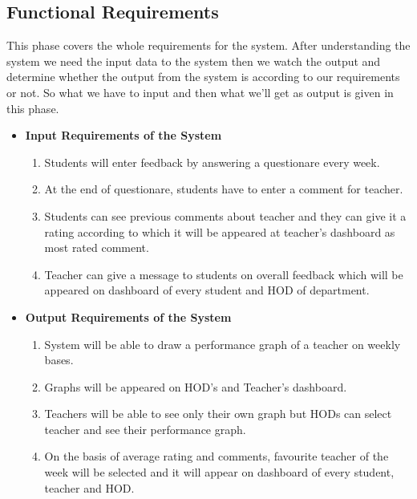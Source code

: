 \subsection{Functional Requirements}
This phase covers the whole requirements for the system. After 
understanding the system we need the input data to the system then we 
watch the output and determine whether the output from the system is 
according to our requirements or not. So what we have to input and 
then what we’ll get as output is given in this phase.
\begin{itemize}
    \item{\bf Input Requirements of the System}
        \begin{enumerate}
            \item Students will enter feedback by answering a 
                questionare every week.
            \item At the end of questionare, students have to enter a 
                comment for teacher.
            \item Students can see previous comments about teacher and 
                they can give it a rating according to which it will be 
                appeared at teacher's dashboard as most rated comment.
            \item Teacher can give a message to students on overall 
                feedback which will be appeared on dashboard of every 
                student and HOD of department.
        \end{enumerate}
    \item{\bf Output Requirements of the System}
        \begin{enumerate}
            \item System will be able to draw a performance graph of a
                teacher on weekly bases.
            \item Graphs will be appeared on HOD's and Teacher's dashboard.
            \item Teachers will be able to see only their own graph but HODs
                can select teacher and see their performance graph.
            \item On the basis of average rating and comments, favourite 
                teacher of the week will be selected and it will appear
                on dashboard of every student, teacher and HOD.
        \end{enumerate}
\end{itemize}
